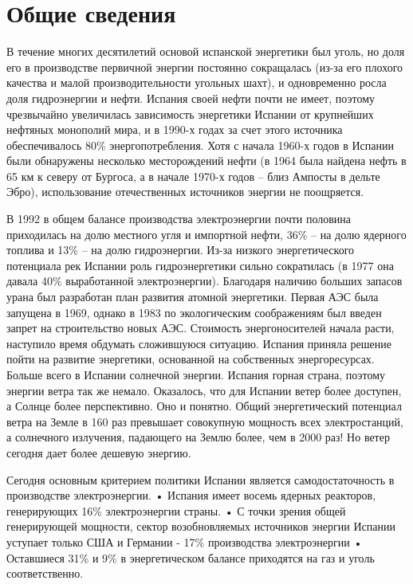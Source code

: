 
\chapter{Общие сведения}
\label{chapter1}

В течение многих десятилетий основой испанской энергетики был уголь, но доля его в производстве первичной энергии постоянно сокращалась (из-за его плохого качества и малой производительности угольных шахт), и одновременно росла доля гидроэнергии и нефти. Испания своей нефти почти не имеет, поэтому чрезвычайно увеличилась зависимость энергетики Испании от крупнейших нефтяных монополий мира, и в 1990-х годах за счет этого источника обеспечивалось 80\% энергопотребления. Хотя с начала 1960-х годов в Испании были обнаружены несколько месторождений нефти (в 1964 была найдена нефть в 65 км к северу от Бургоса, а в начале 1970-х годов – близ Ампосты в дельте Эбро), использование отечественных источников энергии не поощряется.

В 1992 в общем балансе производства электроэнергии почти половина приходилась на долю местного угля и импортной нефти, 36\% – на долю ядерного топлива и 13\% – на долю гидроэнергии. Из-за низкого энергетического потенциала рек Испании роль гидроэнергетики сильно сократилась (в 1977 она давала 40\% выработанной электроэнергии). Благодаря наличию больших запасов урана был разработан план развития атомной энергетики. Первая АЭС была запущена в 1969, однако в 1983 по экологическим соображениям был введен запрет на строительство новых АЭС. Стоимость энергоносителей начала расти, наступило время обдумать сложившуюся ситуацию. Испания приняла решение пойти на развитие энергетики, основанной на собственных энергоресурсах. Больше всего в Испании солнечной энергии. Испания горная страна, поэтому энергии ветра так же немало. Оказалось, что для Испании ветер более доступен, а Солнце более перспективно. Оно и понятно. Общий энергетический потенциал ветра на Земле в 160 раз превышает совокупную мощность всех электростанций, а солнечного излучения, падающего на Землю более, чем в 2000 раз! Но ветер сегодня дает более дешевую энергию.

Сегодня основным критерием политики Испании является самодостаточность в производстве электроэнергии.
• Испания имеет восемь ядерных реакторов, генерирующих 16\% электроэнергии страны.
• С точки зрения общей генерирующей мощности, сектор возобновляемых источников энергии Испании уступает только США и Германии - 17\% производства электроэнергии
• Оставшиеся 31\% и 9\% в энергетическом балансе приходятся на газ и уголь соответственно.

